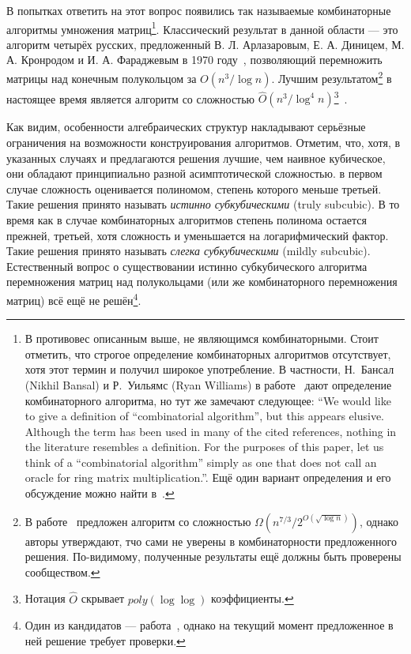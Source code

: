 В попытках ответить на этот вопрос появились так называемые комбинаторные алгоритмы умножения матриц\footnote{В противовес описанным выше, не являющимся комбинаторными. Стоит отметить, что строгое определение комбинаторных алгоритмов отсутствует, хотя этот термин и получил широкое употребление. В частности, Н.~Бансал (Nikhil Bansal) и Р.~Уильямс (Ryan Williams) в работе~\cite{5438580} дают определение комбинаторного алгоритма, но тут же замечают следующее: ``We would like to give a definition of ``combinatorial algorithm'', but this appears elusive. Although the term has been used in many of the cited references, nothing in the literature resembles a definition. For the purposes of this paper, let us think of a ``combinatorial algorithm'' simply as one that does not call an oracle for ring matrix multiplication.''. Ещё один вариант определения и его обсуждение можно найти в~\cite{das2018lower}.}. Классический результат в данной области --- это алгоритм четырёх русских, предложенный  В. Л. Арлазаровым, Е. А. Диницем, М. А. Кронродом и И. А. Фараджевым в 1970 году~\cite{ArlDinKro70}, позволяющий перемножить матрицы над конечным полукольцом за $O(n^3/\log n)$. Лучшим результатом\footnote{В работе~\cite{das2018lower} предложен алгоритм со сложностью $\Omega(n^{7/3}/2^{O(\sqrt{\log n})})$, однако авторы утверждают, тчо сами не уверены в комбинаторности предложенного решения. По-видимому, полученные результаты ещё должны быть проверены сообществом.} в настоящее время является алгоритм со сложностью $\hat{O}(n^3/\log^4 n)$\footnote{Нотация $\hat{O}$ скрывает $poly(\log\log)$ коэффициенты.}~\cite{10.1007/978-3-662-47672-7_89}.

Как видим, особенности алгебраических структур накладывают серьёзные ограничения на возможности конструирования алгоритмов. Отметим, что, хотя, в указанных случаях и предлагаются решения лучшие, чем наивное кубическое, они обладают принципиально разной асимптотической сложностью. в первом случае сложность оценивается полиномом, степень которого меньше третьей. Такие решения принято называть \textit{истинно субкубическими} (truly subcubic). В то время как в случае комбинаторных алгоритмов степень полинома остается прежней, третьей, хотя сложность и уменьшается на логарифмический фактор. Такие решения принято называть \textit{слегка субкубическими} (mildly subcubic). Естественный вопрос о существовании истинно субкубического алгоритма перемножения матриц над полукольцами (или же комбинаторного перемножения матриц) всё ещё не решён\footnote{Один из кандидатов --- работа~\cite{das2018lower}, однако на текущий момент предложенное в ней решение  требует проверки.}.


